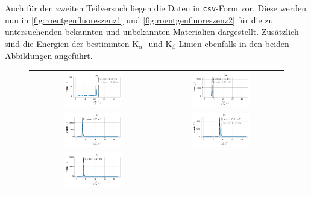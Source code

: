\documentclass[ngerman]{scrartcl}
\begin{document}
Auch für den zweiten Teilversuch liegen die Daten in \texttt{csv}-Form vor. Diese werden nun in \autoref{fig:roentgenfluoreszenz1} und \autoref{fig:roentgenfluoreszenz2} für die zu untersuchenden bekannten und unbekannten Materialien dargestellt. Zusätzlich sind die Energien der bestimmten K$_{\alpha}$- und K$_{\beta}$-Linien ebenfalls in den beiden Abbildungen angeführt.
%
\begin{figure}[H]
    \centering
    \begin{tabular}{cc}
        \includegraphics[width=0.48\textwidth]{../plots/roentgen_data_1.pdf} &
        \includegraphics[width=0.48\textwidth]{../plots/roentgen_data_2.pdf}   \\
        \includegraphics[width=0.48\textwidth]{../plots/roentgen_data_3.pdf} &
        \includegraphics[width=0.48\textwidth]{../plots/roentgen_data_4.pdf}   \\
        \includegraphics[width=0.48\textwidth]{../plots/roentgen_data_5.pdf} &

\end{tabular}
\end{figure}
\end{document}
